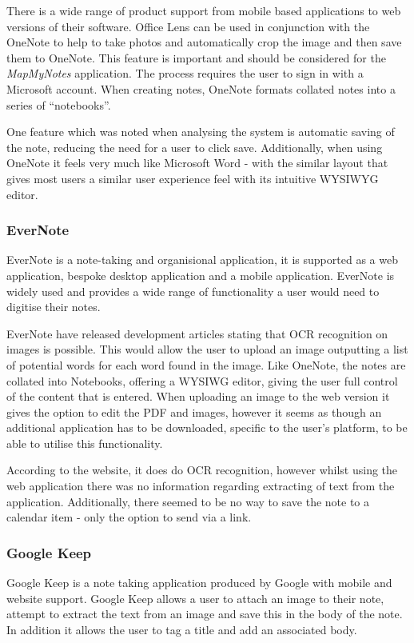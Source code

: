 There is a wide range of product support from mobile based applications to web versions of their software. Office Lens \cite{citeulike:14014272} can be used in conjunction with the OneNote to help to take photos and automatically crop the image and then save them to OneNote. This feature is important and should be considered for the \textit{MapMyNotes} application. The process requires the user to sign in with  a Microsoft account. When creating notes, OneNote formats collated notes into a series of ``notebooks''.

One feature which was noted when analysing the system is automatic saving of the note, reducing the need for a user to click save. Additionally, when using OneNote it feels very much like Microsoft Word - with the similar layout that gives most users a similar user experience feel with its intuitive WYSIWYG editor.

\subsubsection{EverNote}
EverNote \cite{citeulike:14014282} is a note-taking and organisional application, it is supported as a web application, bespoke desktop application and a mobile application. EverNote is widely used and provides a wide range of functionality a user would need to digitise their notes.

EverNote have released development articles \cite{citeulike:13988110} stating that OCR recognition on images is possible. This would allow the user to upload an image outputting a list of potential words for each word found in the image. Like OneNote, the notes are collated into Notebooks, offering a WYSIWG editor, giving the user full control of the content that is entered. When uploading an image to the web version it gives the option to edit the PDF and images, however it seems as though an additional application has to be downloaded, specific to the user's platform, to be able to utilise this functionality.

According to the website, it does do OCR recognition, however whilst using the web application there was no information regarding extracting of text from the application. Additionally, there seemed to be no way to save the note to a calendar item - only the option to send via a link.

\subsubsection{Google Keep}
Google Keep \cite{citeulike:14014320} is a note taking application produced by Google with mobile and website support. Google Keep allows a user to attach an image to their note, attempt to extract the text from an image and save this in the body of the note. In addition it allows the user to tag a title and add an associated body.

